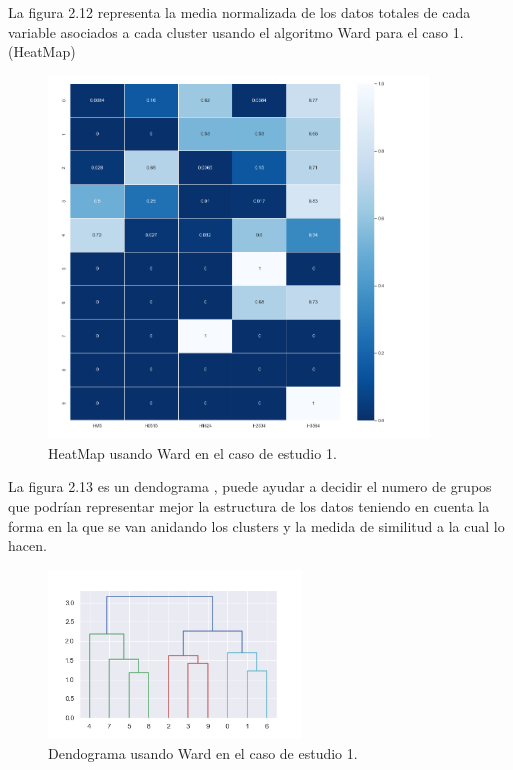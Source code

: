 	La figura 2.12 representa la media normalizada de los datos totales de cada variable asociados
	a cada cluster usando el algoritmo Ward para el caso 1. (HeatMap) \\

	\begin{figure}[htb]
		\centering
		\includegraphics[width=0.9\textwidth]{./imagenes/caso1/heatmap_caso1_Ward}
		\caption{HeatMap usando Ward en el caso de estudio 1.} \label{fig:1}
	\end{figure}


	La figura 2.13 es un dendograma , puede ayudar a decidir el numero de grupos que podrían representar
	mejor la estructura de los datos teniendo en cuenta la forma en la que se van anidando los clusters
	y la medida de similitud a la cual lo hacen. \\

	\begin{figure}[htb]
		\centering
		\includegraphics[width=0.6\textwidth]{./imagenes/caso1/dendograma_caso1_Ward}
		\caption{Dendograma usando Ward en el caso de estudio 1.} \label{fig:1}
	\end{figure}

